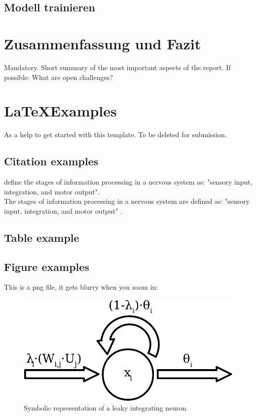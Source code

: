 

\subsection{Modell trainieren}



\section{Zusammenfassung und Fazit}
Mandatory. Short summary of the most important aspects of the report.
If possible: What are open challenges?

\newpage
\section{\LaTeX Examples}
As a help to get started with this template. To be deleted for submission.
\subsection{Citation examples}
\citet{campbell:2017} define the stages of information processing in a nervous system as: "sensory input, integration, and motor output". \\
The stages of information processing in a nervous system are defined as: "sensory input, integration, and motor output" \citep{campbell:2017}. 

\subsection{Table example}


\subsection{Figure examples}
This is a png file, it gets blurry when you zoom in:
\begin{figure}[htbp]
    \centering
    \includegraphics[width=.7\textwidth]{figures/leaky_integration.png}
    \caption{Symbolic representation of a leaky integrating neuron.}
    \label{fig:leaky_integration}
\end{figure}

